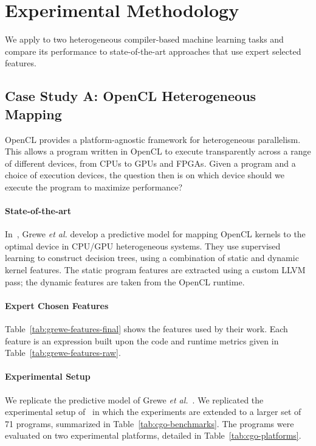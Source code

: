 \section{Experimental Methodology} \label{sec:methodology}

We apply \DeepTune to two heterogeneous compiler-based machine learning tasks and compare its performance to state-of-the-art approaches that use expert selected features.


\subsection{Case Study A: OpenCL Heterogeneous Mapping} \label{subsec:case-study-a}



OpenCL provides a platform-agnostic framework for heterogeneous parallelism. This allows a program written in OpenCL to execute transparently across a range of different devices, from CPUs to GPUs and FPGAs. Given a program and a choice of execution devices, the question then is on which device should we execute the program to maximize performance?

\paragraph{State-of-the-art} In~\cite{Grewe2013}, Grewe \emph{et al.} develop a predictive model for mapping OpenCL kernels to the optimal device in CPU/GPU heterogeneous systems. They use supervised learning to construct decision trees, using a combination of static and dynamic kernel features. The static program features are extracted using a custom LLVM pass; the dynamic features are taken from the OpenCL runtime.

\paragraph{Expert Chosen Features} Table~\ref{tab:grewe-features-final} shows the features used by their work. Each feature is an expression built upon the code and runtime metrics given in Table~\ref{tab:grewe-features-raw}.

\paragraph{Experimental Setup} We replicate the predictive model of Grewe \emph{et al.}~\cite{Grewe2013}. We replicated the experimental setup of~\cite{Cummins2017a} in which the experiments are extended to a larger set of 71 programs, summarized in Table~\ref{tab:cgo-benchmarks}. The programs were evaluated on two experimental platforms, detailed in Table~\ref{tab:cgo-platforms}.

